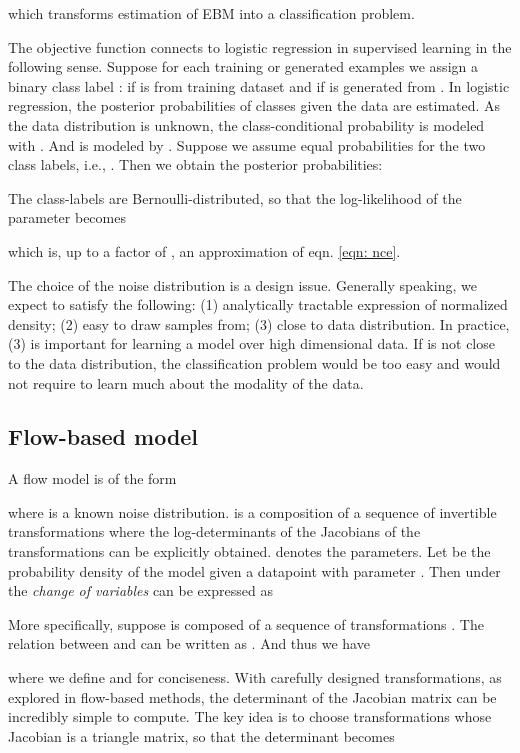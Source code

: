 \documentclass[10pt,twocolumn,letterpaper]{article}
\begin{document}
which transforms estimation of EBM into a classification problem. 

The objective function connects to logistic regression in supervised learning in the following sense. Suppose for each training or generated examples we assign a binary class label :  if  is from training dataset and  if  is generated from . In logistic regression, the posterior probabilities of classes given the data  are estimated. As the data distribution  is unknown, the class-conditional probability  is modeled with . And  is modeled by . Suppose we assume equal probabilities for the two class labels, i.e., . Then we obtain the posterior probabilities:

The class-labels  are Bernoulli-distributed, so that the log-likelihood of the parameter  becomes 

which is, up to a factor of , an approximation of eqn. \ref{eqn: nce}.

The choice of the noise distribution  is a design issue. Generally speaking, we expect  to satisfy the following: (1) analytically tractable expression of normalized density; (2) easy to draw samples from; (3) close to data distribution. In practice, (3) is important for learning a model over high dimensional data. If  is not close to the data distribution, the classification problem would be too easy and would not require  to learn much about the modality of the data. 

\subsection{Flow-based model}
\label{sect: flow}
A flow model is of the form 
 
where  is a known noise distribution.  is a composition of a sequence of invertible transformations where the log-determinants of the Jacobians of the transformations can be explicitly obtained.   denotes the parameters. Let  be the probability density of the model given a datapoint  with parameter . Then under the \emph{change of variables}  can be expressed as


More specifically, suppose  is composed of a sequence of transformations . The relation between  and  can be written as . And thus we have 

where we define  and  for conciseness. With carefully designed transformations, as explored in flow-based methods, the determinant of the Jacobian matrix  can be incredibly simple to compute. The key idea is to choose transformations whose Jacobian is a triangle matrix, so that the determinant becomes 
\end{document}
